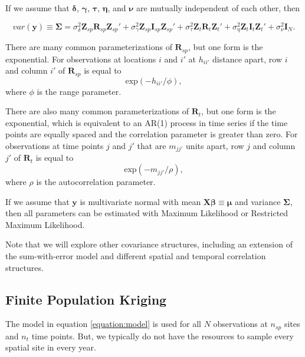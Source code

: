 \documentclass[]{interact}
\theoremstyle{plain}%
\theoremstyle{definition}
\theoremstyle{remark}
\begin{document}
If we assume that \(\bm{\delta}\), \(\bm{\gamma}\), \(\bm{\tau}\),
\(\bm{\eta}\), and \(\bm{\nu}\) are mutually independent of each other,
then

\begin{equation}
var(\mathbf{y}) \equiv \bm{\Sigma} = \sigma^2_{\delta} \mathbf{Z}_{sp} \mathbf{R}_{sp} \mathbf{Z}_{sp}' + \sigma^2_{\gamma} \mathbf{Z}_{sp} \mathbf{I}_{sp} \mathbf{Z}_{sp}' + \sigma^2_{\tau} \mathbf{Z}_t \mathbf{R}_t \mathbf{Z}_t'+ \sigma^2_{\eta} \mathbf{Z}_t \mathbf{I}_t \mathbf{Z}_t' + \sigma^2_{\nu} \mathbf{I}_N.
\end{equation}

There are many common parameterizations of \(\mathbf{R}_{sp}\), but one
form is the exponential. For observations at locations \(i\) and \(i'\)
at \(h_{ii'}\) distance apart, row \(i\) and column \(i'\) of
\(\mathbf{R}_{sp}\) is equal to \mbox{} \begin{equation}
\text{exp}(-h_{ii'} / \phi),
\end{equation} \noindent where \(\phi\) is the range parameter.

There are also many common parameterizations of \(\mathbf{R}_t\), but
one form is the exponential, which is equivalent to an AR(1) process in
time series if the time points are equally spaced and the correlation
parameter is greater than zero. For observations at time points \(j\)
and \(j'\) that are \(m_{jj'}\) units apart, row \(j\) and column \(j'\)
of \(\mathbf{R}_{t}\) is equal to \mbox{} \begin{equation}
\text{exp}(-m_{jj'} / \rho),
\end{equation} \noindent where \(\rho\) is the autocorrelation
parameter.

If we assume that \(\mathbf{y}\) is multivariate normal with mean
\(\mathbf{X} \bm{\beta} \equiv \bm{\mu}\) and variance \(\bm{\Sigma}\),
then all parameters can be estimated with Maximum Likelihood or
Restricted Maximum Likelihood.

Note that we will explore other covariance structures, including an
extension of the sum-with-error model and different spatial and temporal
correlation structures.

\subsection{Finite Population Kriging}

The model in equation \ref{equation:model} is used for all \(N\)
observations at \(n_{sp}\) sites and \(n_t\) time points. But, we
typically do not have the resources to sample every spatial site in
every year.
\end{document}
